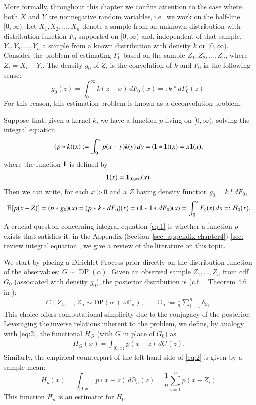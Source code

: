 More formally, throughout this chapter we confine attention to the case where both $X$ and $Y$ are nonneg\-ative random variables, i.e.\ we work on the half-line $[0,\infty)$. Let $X_1, X_2, \dots, X_n$ denote a sample from an unknown distribution with distribution function $F_0$ supported on $[0, \infty)$ and, independent of that sample, $Y_1, Y_2, \dots, Y_n$ a sample from a known distribution with density $k$ on $[0, \infty)$. Consider the problem of estimating $F_0$ based on the sample $Z_1, Z_2, \dots, Z_n$, where $Z_i = X_i + Y_i$. The density $g_0$ of $Z_i$ is the convolution of $k$ and $F_0$ in the following sense:
\[
g_0(z) = \int_{0}^{\infty} k(z - x) \, dF_0(x) =: k \ast dF_0(z).
\]
For this reason, this estimation problem is known as a deconvolution problem.

Suppose that, given a kernel $k$, we have a function $p$ living on $[0, \infty)$, solving the integral equation
\begin{equation} \label{eq:1}
(p \ast k)(x) := \int_0^x p(x-y)k(y) \, dy = (\mathbf{1}{} \ast \mathbf{1}{})(x) = x\mathbf{1}{}(x),
\end{equation}
where the function $\mathbf{1}{}$ is defined by
\[
\mathbf{1}{}(x) = \mathbf{1}_{[0, \infty)}(x).
\]
Then we can write, for each $x > 0$ and a $Z$ having density function $g_0 = k \ast dF_0$,
\begin{equation} \label{eq:2}
\mathrm{E}[p(x-Z)] = (p \ast g_0)(x) = (p \ast k \ast dF_0)(x) = (\mathbf{1}{} \ast \mathbf{1}{} \ast dF_0)(x) = \int_0^x F_0(s) \, ds =: H_0 (x).
\end{equation}
A crucial question concerning integral equation \eqref{eq:1} is whether a function $p$ exists that satisfies it. in the Appendix (Section~\ref{sec: appendix chapter4}) \ref{sec: review integral equation}, we give a review of the literature on this topic.

We start by placing a Dirichlet Process prior directly on the distribution function of the observables: \( G \sim \operatorname{DP}(\alpha) \). Given an observed sample \( Z_1, \dots, Z_n \) from cdf \( G_0 \) (associated with density $g_0$), the posterior distribution is (c.f.\ \cite{59}, Theorem 4.6 in \cite{4}):
\begin{align}\label{eq: dirichlet posterior chapter4}
	G \mid Z_1,\ldots,Z_n \sim \text{DP}(\alpha + n \mathbb{G}_n), \quad \quad  \mathbb{G}_n := \frac{1}{n} \sum_{i=1}^n \delta_{Z_i}.
\end{align}
This choice offers computational simplicity due to the conjugacy of the posterior. Leveraging the inverse relations inherent to the problem, we define, by analogy with \eqref{eq:2}, the functional $H_{\scriptscriptstyle{G}}$ (with $G$ in place of $G_0$) as
\begin{align}\label{eq: naive bayes chapter4}
	H_{\scriptscriptstyle{G}}(x)=\int_{[0, x)} p(x-z) \, d G(z).
\end{align}
Similarly, the empirical counterpart of the left-hand side of \eqref{eq:2} is given by a sample mean:
$$
H_n(x)=\int_{[0, x)} p(x-z) \, d \mathbb{G}_n(z)=\frac{1}{n} \sum_{i=1}^n p\left(x-Z_i\right)
$$
This function $H_n$ is an estimator for $H_0$. 

